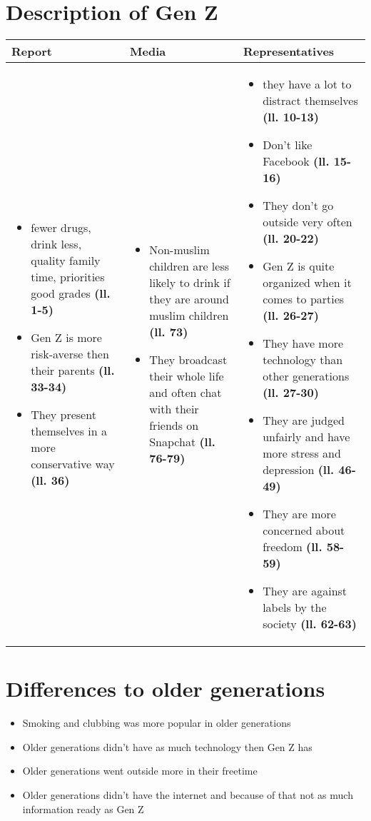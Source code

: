 \documentclass[12pt,a4paper]{report}
\newcommand{\lx}[1]{\textbf{(ll. #1)}}
\begin{document}
	\section{Description of Gen Z}
	\begin{tabularx}{\textwidth}{|X|X|X|}
		\hline
		\textbf{Report} & \textbf{Media} & \textbf{Representatives} \\
		\hline
		\begin{itemize}
			\item fewer drugs, drink less, quality family time, priorities good grades \lx{1-5}
			\item Gen Z is more risk-averse then their parents \lx{33-34}
			\item They present themselves in a more conservative way \lx{36}
		\end{itemize}
		& \begin{itemize}
			\item Non-muslim children are less likely to drink if they are around muslim children \lx{73}
			\item They broadcast their whole life and often chat with their friends on Snapchat \lx{76-79}
		\end{itemize}
		& \begin{itemize}
			\item they have a lot to distract themselves \lx{10-13}
			\item Don't like Facebook \lx{15-16}
			\item They don't go outside very often \lx{20-22}
			\item Gen Z is quite organized when it comes to parties \lx{26-27}
			\item They have more technology than other generations \lx{27-30}
			\item They are judged unfairly and have more stress and depression \lx{46-49}
			\item They are more concerned about freedom \lx{58-59}
			\item They are against labels by the society \lx{62-63}
		\end{itemize}
		\\
		\hline
	\end{tabularx}
	
	\section{Differences to older generations}
	\begin{itemize}
		\item Smoking and clubbing was more popular in older generations
		\item Older generations didn't have as much technology then Gen Z has
		\item Older generations went outside more in their freetime
		\item Older generations didn't have the internet and because of that not as much information ready as Gen Z
	\end{itemize}
\end{document}
